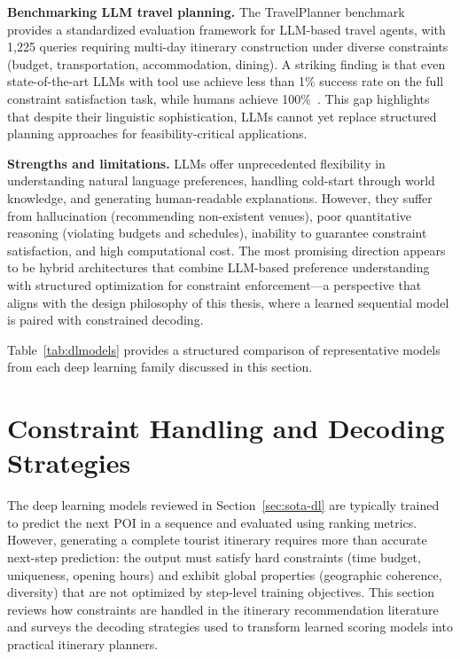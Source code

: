 \textbf{Benchmarking LLM travel planning.} The TravelPlanner benchmark~\cite{xie2024travelplanning} provides a standardized evaluation framework for LLM-based travel agents, with 1,225 queries requiring multi-day itinerary construction under diverse constraints (budget, transportation, accommodation, dining). A striking finding is that even state-of-the-art LLMs with tool use achieve less than 1\% success rate on the full constraint satisfaction task, while humans achieve 100\%~\cite{xie2024travelplanning}. This gap highlights that despite their linguistic sophistication, LLMs cannot yet replace structured planning approaches for feasibility-critical applications.

\textbf{Strengths and limitations.} LLMs offer unprecedented flexibility in understanding natural language preferences, handling cold-start through world knowledge, and generating human-readable explanations. However, they suffer from hallucination (recommending non-existent venues), poor quantitative reasoning (violating budgets and schedules), inability to guarantee constraint satisfaction, and high computational cost. The most promising direction appears to be hybrid architectures that combine LLM-based preference understanding with structured optimization for constraint enforcement---a perspective that aligns with the design philosophy of this thesis, where a learned sequential model is paired with constrained decoding.

\medskip

Table~\ref{tab:dlmodels} provides a structured comparison of representative models from each deep learning family discussed in this section.



\section{Constraint Handling and Decoding Strategies}
\label{sec:sota-decoding}

The deep learning models reviewed in Section~\ref{sec:sota-dl} are typically trained to predict the next POI in a sequence and evaluated using ranking metrics. However, generating a complete tourist itinerary requires more than accurate next-step prediction: the output must satisfy hard constraints (time budget, uniqueness, opening hours) and exhibit global properties (geographic coherence, diversity) that are not optimized by step-level training objectives. This section reviews how constraints are handled in the itinerary recommendation literature and surveys the decoding strategies used to transform learned scoring models into practical itinerary planners.

